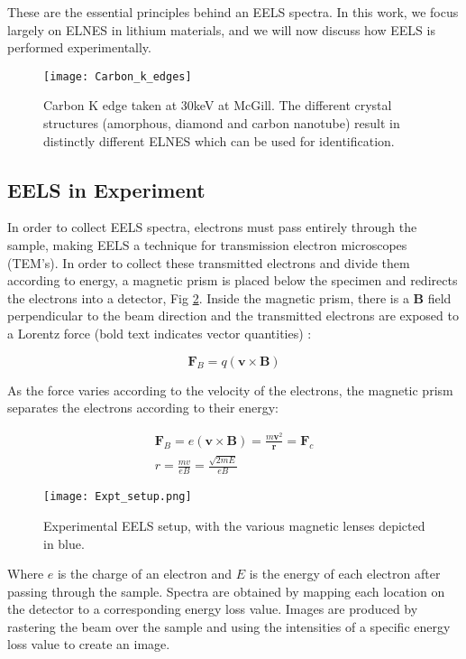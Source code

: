 These are the essential principles behind an EELS spectra.  In this work, we focus largely on ELNES in lithium materials, and we will now discuss how EELS is performed experimentally.

\begin{figure}
	\centering
	\texttt{[image: Carbon\_k\_edges]}
	\caption{Carbon K edge taken at 30keV at McGill. The different crystal structures (amorphous, diamond and carbon nanotube) result in distinctly different ELNES which can be used for identification.   }
	\label{carbon-k-edge}
\end{figure}


\subsection{EELS in Experiment}

In order to collect EELS spectra, electrons must pass entirely through the sample, making EELS a technique for transmission electron microscopes (TEM's)\cite{Egerton}. In order to collect these transmitted electrons and divide them according to energy, a magnetic prism is placed below the specimen and redirects the electrons into a detector, Fig \ref{prism}.  Inside the magnetic prism, there is a $\mathrm{\textbf{B}}$ field perpendicular to the beam direction and the transmitted electrons are exposed to a Lorentz force (bold text indicates vector quantities) \cite{griffiths_em}: 


\begin{equation}
	\textbf{F}_B = q (\textbf{v} \times \textbf{B})
\end{equation}

As the force varies according to the velocity of the electrons, the magnetic prism  separates the electrons according to their energy: 

\begin{gather}
\textbf{F}_B = e (\textbf{v} \times \textbf{B}) =  \frac{m \textbf{v}^2}{\textbf{r}} = \textbf{F}_c \\
 r =  \frac{mv}{eB} = \frac{\sqrt{2mE}}{eB}
\end{gather}

\begin{figure}
 \centering
 \texttt{[image: Expt\_setup.png]}
 \caption{Experimental EELS setup, with the various magnetic lenses depicted in blue.  }
 \label{prism}
 
\end{figure}

Where $e$ is the charge of an electron and $E$ is the energy of each electron after passing through the sample.  Spectra are obtained by mapping each location on the detector to a corresponding energy loss value. Images are produced by  rastering the beam over the sample and using the intensities of a specific energy loss value to create an image. 

